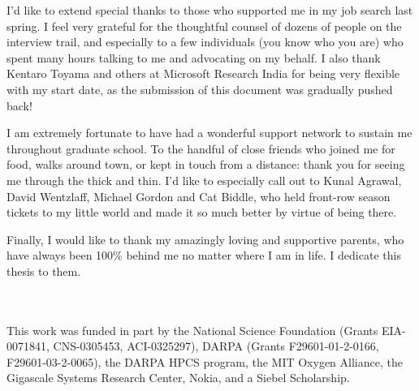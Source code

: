 I'd like to extend special thanks to those who supported me in my
job search last spring.  I feel very grateful for the thoughtful
counsel of dozens of people on the interview trail, and especially
to a few individuals (you know who you are) who spent many hours
talking to me and advocating on my behalf.  
I also thank Kentaro Toyama and others at Microsoft Research India
for being very flexible with my start date, as the submission of
this document was gradually pushed back!

I am extremely fortunate to have had a wonderful support network to
sustain me throughout graduate school.  To the handful of close
friends who joined me for food, walks around town, or kept in touch
from a distance: thank you for seeing me through the thick and thin.
I'd like to especially call out to Kunal Agrawal, David Wentzlaff,
Michael Gordon and Cat Biddle, who held front-row season tickets to
my little world and made it so much better by virtue of being there.

Finally, I would like to thank my amazingly loving and supportive
parents, who have always been 100\% behind me no matter where I am
in life.  I dedicate this thesis to them.

\clearpage
~ \\ \vspace{3.69in} ~ \\
\noindent This work was funded in part by the National Science 
Foundation (Grants EIA-0071841, CNS-0305453, ACI-0325297), DARPA
(Grants F29601-01-2-0166, F29601-03-2-0065), the DARPA HPCS program,
the MIT Oxygen Alliance, the Gigascale Systems Research Center, Nokia,
and a Siebel Scholarship.
\vspace{-0.2in}
\clearpage


